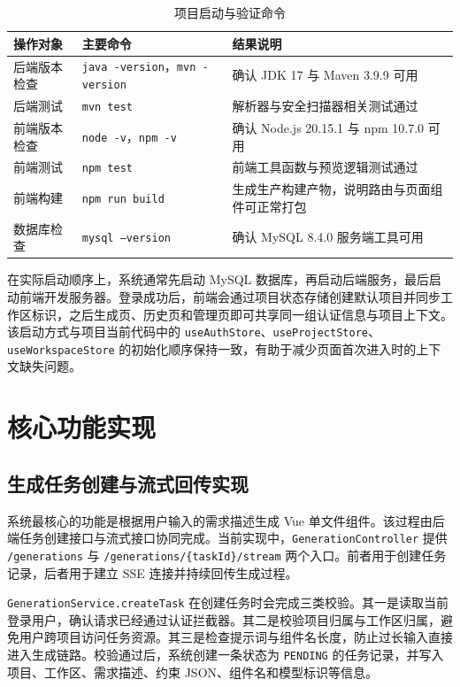 \begin{table}[!htbp]
\centering
\caption{项目启动与验证命令}
\label{tab:chapter5-verify}
\small
\begin{tabular}{@{}p{}p{}p{}@{}}
\toprule
操作对象 & 主要命令 & 结果说明 \\
\midrule
后端版本检查 & \texttt{java -version}，\texttt{mvn -version} & 确认 JDK 17 与 Maven 3.9.9 可用 \\
后端测试 & \texttt{mvn test} & 解析器与安全扫描器相关测试通过 \\
前端版本检查 & \texttt{node -v}，\texttt{npm -v} & 确认 Node.js 20.15.1 与 npm 10.7.0 可用 \\
前端测试 & \texttt{npm test} & 前端工具函数与预览逻辑测试通过 \\
前端构建 & \texttt{npm run build} & 生成生产构建产物，说明路由与页面组件可正常打包 \\
数据库检查 & \texttt{mysql --version} & 确认 MySQL 8.4.0 服务端工具可用 \\
\bottomrule
\end{tabular}
\end{table}

在实际启动顺序上，系统通常先启动 MySQL 数据库，再启动后端服务，最后启动前端开发服务器。登录成功后，前端会通过项目状态存储创建默认项目并同步工作区标识，之后生成页、历史页和管理页即可共享同一组认证信息与项目上下文。该启动方式与项目当前代码中的 \texttt{useAuthStore}、\texttt{useProjectStore}、\texttt{useWorkspaceStore} 的初始化顺序保持一致，有助于减少页面首次进入时的上下文缺失问题。

\section{核心功能实现}

\subsection{生成任务创建与流式回传实现}
系统最核心的功能是根据用户输入的需求描述生成 Vue 单文件组件。该过程由后端任务创建接口与流式接口协同完成。当前实现中，\texttt{GenerationController} 提供 \texttt{/generations} 与 \texttt{/generations/\{taskId\}/stream} 两个入口。前者用于创建任务记录，后者用于建立 SSE 连接并持续回传生成过程。

\texttt{GenerationService.createTask} 在创建任务时会完成三类校验。其一是读取当前登录用户，确认请求已经通过认证拦截器。其二是校验项目归属与工作区归属，避免用户跨项目访问任务资源。其三是检查提示词与组件名长度，防止过长输入直接进入生成链路。校验通过后，系统创建一条状态为 \texttt{PENDING} 的任务记录，并写入项目、工作区、需求描述、约束 JSON、组件名和模型标识等信息。

